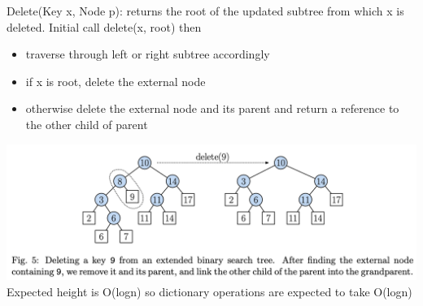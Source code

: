 \documentclass{article}
\begin{document}
  \newpage
  Delete(Key x, Node p): returns the root of the updated subtree from which x is deleted. Initial call delete(x, root) then
  \begin{itemize}
    \item traverse through left or right subtree accordingly
    \item if x is root, delete the external node
    \item otherwise delete the external node and its parent and return a reference to the other child of parent \\
  \end{itemize}
  \includegraphics[width=\textwidth]{ExtendedBSTDeletion}
  Expected height is O(logn) so dictionary operations are expected to take O(logn)
\end{document}
